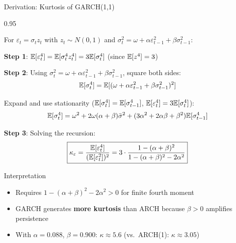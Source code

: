\documentclass[9pt, aspectratio=169, t]{beamer}
\begin{document}
\begin{frame}{Derivation: Kurtosis of GARCH(1,1)}
    \begin{cminipage}{0.95\textwidth}
    {\small
    For $\varepsilon_t = \sigma_t z_t$ with $z_t \sim N(0,1)$ and $\sigma_t^2 = \omega + \alpha \varepsilon_{t-1}^2 + \beta \sigma_{t-1}^2$:

    \textbf{Step 1}: $\mathbb{E}[\varepsilon_t^4] = \mathbb{E}[\sigma_t^4 z_t^4] = 3\mathbb{E}[\sigma_t^4]$ (since $\mathbb{E}[z^4] = 3$)

    \textbf{Step 2}: Using $\sigma_t^2 = \omega + \alpha \varepsilon_{t-1}^2 + \beta \sigma_{t-1}^2$, square both sides:
    \vspace{-2mm}
    \[
        \mathbb{E}[\sigma_t^4] = \mathbb{E}[(\omega + \alpha\varepsilon_{t-1}^2 + \beta\sigma_{t-1}^2)^2]
    \]
    \vspace{-2mm}

    Expand and use stationarity ($\mathbb{E}[\sigma_t^4] = \mathbb{E}[\sigma_{t-1}^4]$, $\mathbb{E}[\varepsilon_t^4] = 3\mathbb{E}[\sigma_t^4]$):
    \vspace{-2mm}
    \[
        \mathbb{E}[\sigma_t^4] = \omega^2 + 2\omega(\alpha+\beta)\bar{\sigma}^2 + (3\alpha^2 + 2\alpha\beta + \beta^2)\mathbb{E}[\sigma_{t-1}^4]
    \]
    \vspace{-2mm}

    \textbf{Step 3}: Solving the recursion:
    \vspace{-2mm}
    \[
        \boxed{\kappa_{\varepsilon} = \frac{\mathbb{E}[\varepsilon_t^4]}{(\mathbb{E}[\varepsilon_t^2])^2} = 3 \cdot \frac{1 - (\alpha+\beta)^2}{1 - (\alpha+\beta)^2 - 2\alpha^2}}
    \]
    }
    \vspace{-2mm}
    \begin{block}{Interpretation}
        \begin{itemize}\setlength{\itemsep}{0pt}
            \item Requires $1 - (\alpha+\beta)^2 - 2\alpha^2 > 0$ for finite fourth moment
            \item GARCH generates \textbf{more kurtosis} than ARCH because $\beta > 0$ amplifies persistence
            \item With $\alpha = 0.088$, $\beta = 0.900$: $\kappa \approx 5.6$ (vs.\ ARCH(1): $\kappa \approx 3.05$)
        \end{itemize}
    \end{block}
    \end{cminipage}
\end{frame}
\end{document}
